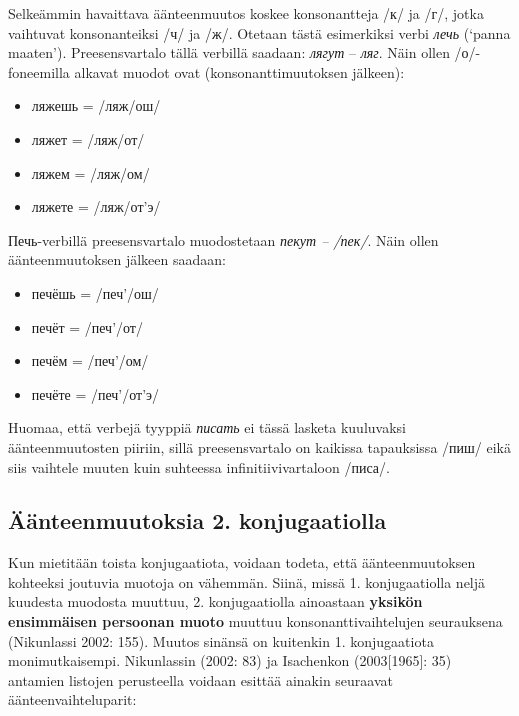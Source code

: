 \documentclass[]{scrreprt}
\providecommand{\tightlist}{%
  \setlength{\itemsep}{0pt}\setlength{\parskip}{0pt}}
\begin{document}
Selkeämmin havaittava äänteenmuutos koskee konsonantteja /к/ ja /г/,
jotka vaihtuvat konsonanteiksi /ч/ ja /ж/. Otetaan tästä esimerkiksi
verbi \emph{лечь} (`panna maaten'). Preesensvartalo tällä verbillä
saadaan: \emph{лягут} -- \emph{ляг}. Näin ollen /о/-foneemilla alkavat
muodot ovat (konsonanttimuutoksen jälkeen):

\begin{itemize}
\tightlist
\item
  ляжешь = /ляж/ош/
\item
  ляжет = /ляж/от/
\item
  ляжем = /ляж/ом/
\item
  ляжете = /ляж/от'э/
\end{itemize}

Печь-verbillä preesensvartalo muodostetaan \emph{пекут -- /пек/}. Näin
ollen äänteenmuutoksen jälkeen saadaan:

\begin{itemize}
\tightlist
\item
  печёшь = /печ'/ош/
\item
  печёт = /печ'/от/
\item
  печём = /печ'/ом/
\item
  печёте = /печ'/от'э/
\end{itemize}

Huomaa, että verbejä tyyppiä \emph{писать} ei tässä lasketa kuuluvaksi
äänteenmuutosten piiriin, sillä preesensvartalo on kaikissa tapauksissa
/пиш/ eikä siis vaihtele muuten kuin suhteessa infinitiivivartaloon
/писа/.

\subsection{Äänteenmuutoksia 2.
konjugaatiolla}\label{uxe4uxe4nteenmuutoksia-2.-konjugaatiolla}

Kun mietitään toista konjugaatiota, voidaan todeta, että
äänteenmuutoksen kohteeksi joutuvia muotoja on vähemmän. Siinä, missä 1.
konjugaatiolla neljä kuudesta muodosta muuttuu, 2. konjugaatiolla
ainoastaan \textbf{yksikön ensimmäisen persoonan muoto} muuttuu
konsonanttivaihtelujen seurauksena (Nikunlassi 2002: 155). Muutos
sinänsä on kuitenkin 1. konjugaatiota monimutkaisempi. Nikunlassin
(2002: 83) ja Isachenkon (2003{[}1965{]}: 35) antamien listojen
perusteella voidaan esittää ainakin seuraavat äänteenvaihteluparit:
\end{document}
